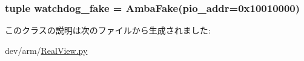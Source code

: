 \label{classRealView_1_1RealViewPBX_ac8f4703047b3e05e27410c2c79b2f043}
\hypertarget{classRealView_1_1RealViewPBX_a6dfafd229651b87c734e8433a613a8a4}{
\subsubsection[{watchdog\_\-fake}]{\setlength{\rightskip}{0pt plus 5cm}tuple {\bf watchdog\_\-fake} = {\bf AmbaFake}(pio\_\-addr=0x10010000)}}
\label{classRealView_1_1RealViewPBX_a6dfafd229651b87c734e8433a613a8a4}


このクラスの説明は次のファイルから生成されました:\begin{DoxyCompactItemize}
\item 
dev/arm/\hyperlink{RealView_8py}{RealView.py}\end{DoxyCompactItemize}
